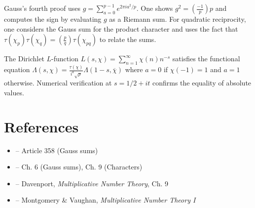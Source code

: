 \begin{solution}
Gauss's fourth proof uses $g = \sum_{a=0}^{p-1} e^{2\pi i a^2/p}$. One shows $g^2 = \left(\frac{-1}{p}\right) p$ and computes the sign by evaluating $g$ as a Riemann sum. For quadratic reciprocity, one considers the Gauss sum for the product character and uses the fact that $\tau(\chi_p)\tau(\chi_q) = \left(\frac{p}{q}\right)\tau(\chi_{pq})$ to relate the sums.
\end{solution}

\begin{solution}
The Dirichlet $L$-function $L(s, \chi) = \sum_{n=1}^{\infty} \chi(n) n^{-s}$ satisfies the functional equation $\Lambda(s, \chi) = \frac{\tau(\chi)}{i^a \sqrt{p}} \Lambda(1-s, \overline{\chi})$ where $a = 0$ if $\chi(-1) = 1$ and $a = 1$ otherwise. Numerical verification at $s = 1/2 + it$ confirms the equality of absolute values.
\end{solution}


\section{References}

\begin{itemize}
    \item \cite{gauss-disq} -- Article 358 (Gauss sums)
    \item \cite{ireland-rosen} -- Ch. 6 (Gauss sums), Ch. 9 (Characters)
    \item \cite{davenport} -- Davenport, \textit{Multiplicative Number Theory}, Ch. 9
    \item \cite{montgomery-vaughan} -- Montgomery \& Vaughan, \textit{Multiplicative Number Theory I}
\end{itemize}